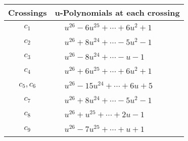 \documentclass[1p]{elsarticle_modified}
\theoremstyle{definition}
\begin{document}
\begin{tabular}{m{50pt}|m{274pt}}
Crossings & \hspace{64pt}u-Polynomials at each crossing \\
\hline $$\begin{aligned}c_{1}\end{aligned}$$&$\begin{aligned}
&u^{26}-6 u^{25}+\cdots+6 u^2+1
\end{aligned}$\\
\hline $$\begin{aligned}c_{2}\end{aligned}$$&$\begin{aligned}
&u^{26}+8 u^{24}+\cdots-5 u^2-1
\end{aligned}$\\
\hline $$\begin{aligned}c_{3}\end{aligned}$$&$\begin{aligned}
&u^{26}-8 u^{24}+\cdots- u-1
\end{aligned}$\\
\hline $$\begin{aligned}c_{4}\end{aligned}$$&$\begin{aligned}
&u^{26}+6 u^{25}+\cdots+6 u^2+1
\end{aligned}$\\
\hline $$\begin{aligned}c_{5},c_{6}\end{aligned}$$&$\begin{aligned}
&u^{26}-15 u^{24}+\cdots+6 u+5
\end{aligned}$\\
\hline $$\begin{aligned}c_{7}\end{aligned}$$&$\begin{aligned}
&u^{26}+8 u^{24}+\cdots-5 u^2-1
\end{aligned}$\\
\hline $$\begin{aligned}c_{8}\end{aligned}$$&$\begin{aligned}
&u^{26}+u^{25}+\cdots+2 u-1
\end{aligned}$\\
\hline $$\begin{aligned}c_{9}\end{aligned}$$&$\begin{aligned}
&u^{26}-7 u^{25}+\cdots+u+1
\end{aligned}$\\

\end{tabular}
\end{document}
